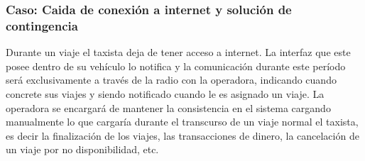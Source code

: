 	\subsubsection{Caso: Caida de conexión a internet y solución de contingencia}
	Durante un viaje el taxista deja de tener acceso a internet. La interfaz que este posee dentro de su veh\'iculo lo notifica y la comunicación durante este per\'iodo será exclusivamente a través de la radio con la operadora, indicando cuando concrete sus viajes y siendo notificado cuando le es asignado un viaje. La operadora se encargará de mantener la consistencia en el sistema cargando manualmente lo que cargar\'ia durante el transcurso de un viaje normal el taxista, es decir la finalización de los viajes, las transacciones de dinero, la cancelación de un viaje por no disponibilidad, etc.